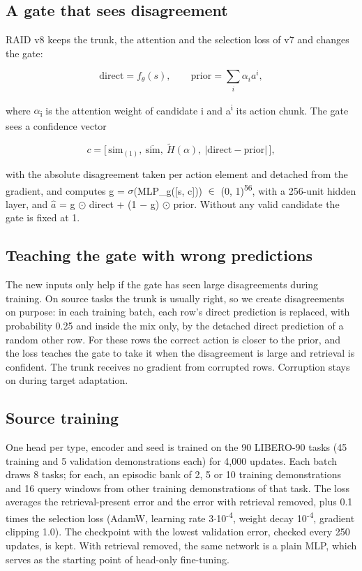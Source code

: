 \documentclass[10pt,twocolumn,letterpaper]{article}
\begin{document}
\subsection{A gate that sees disagreement}

RAID v8 keeps the trunk, the attention and the selection loss of v7 and changes the gate:

\[
\mathrm{direct} = f_\theta(s),\qquad \mathrm{prior} = \textstyle\sum_i \alpha_i a^i,
\]

where \ensuremath{\alpha}\textsubscript{i} is the attention weight of candidate i and a\textsuperscript{i} its action chunk. The gate sees a confidence vector

\[
c = \bigl[\,\mathrm{sim}_{(1)},\ \overline{\mathrm{sim}},\ \tilde H(\alpha),\ |\mathrm{direct}-\mathrm{prior}|\,\bigr],
\]

with the absolute disagreement taken per action element and detached from the gradient, and computes g = \ensuremath{\sigma}(MLP\_g({[}s, c{]})) \ensuremath{\in} (0, 1)\textsuperscript{56}, with a 256-unit hidden layer, and \ensuremath{\hat{a}} = g \ensuremath{\odot} direct + (1 \ensuremath{-} g) \ensuremath{\odot} prior. Without any valid candidate the gate is fixed at 1.

\subsection{Teaching the gate with wrong predictions}

The new inputs only help if the gate has seen large disagreements during training. On source tasks the trunk is usually right, so we create disagreements on purpose: in each training batch, each row's direct prediction is replaced, with probability 0.25 and inside the mix only, by the detached direct prediction of a random other row. For these rows the correct action is closer to the prior, and the loss teaches the gate to take it when the disagreement is large and retrieval is confident. The trunk receives no gradient from corrupted rows. Corruption stays on during target adaptation.

\subsection{Source training}

One head per type, encoder and seed is trained on the 90 LIBERO-90 tasks (45 training and 5 validation demonstrations each) for 4,000 updates. Each batch draws 8 tasks; for each, an episodic bank of 2, 5 or 10 training demonstrations and 16 query windows from other training demonstrations of that task. The loss averages the retrieval-present error and the error with retrieval removed, plus 0.1 times the selection loss (AdamW, learning rate 3\ensuremath{\cdot}10\textsuperscript{-4}, weight decay 10\textsuperscript{-4}, gradient clipping 1.0). The checkpoint with the lowest validation error, checked every 250 updates, is kept. With retrieval removed, the same network is a plain MLP, which serves as the starting point of head-only fine-tuning.
\end{document}
